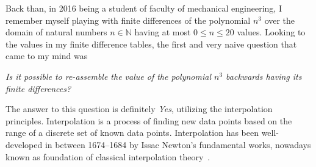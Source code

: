 Back than, in 2016 being a student of faculty of mechanical engineering,
I remember myself playing with finite differences of the polynomial $n^3$ over the domain of natural numbers $n\in\mathbb{N}$
having at most $0 \leq n \leq 20$ values.
Looking to the values in my finite difference tables, the first and very naive question that came to my mind was
\begin{center}
    \textit{Is it possible to re-assemble the value of
    the polynomial $n^3$ backwards having its finite differences?}
\end{center}
The answer to this question is definitely \textit{Yes}, utilizing the interpolation principles.
Interpolation is a process of finding new data points based on the range of a discrete set of known data points.
Interpolation has been well-developed in between 1674--1684
by Issac Newton's fundamental works, nowadays known as foundation of classical interpolation
theory~\cite{meijering2002chronology}.

